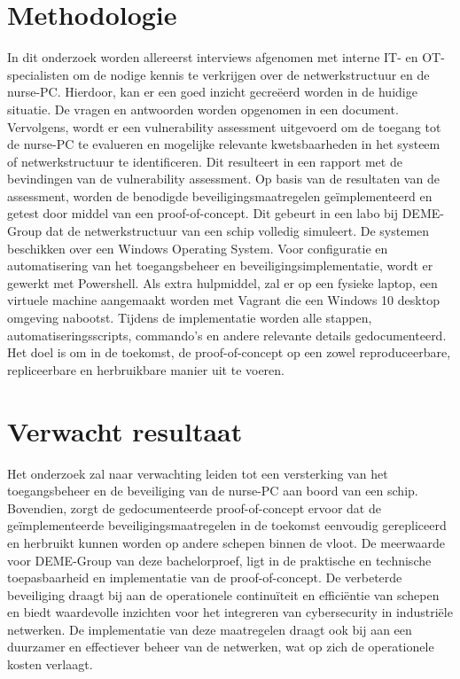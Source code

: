 \section{Methodologie}%
\label{sec:methodologie}
In dit onderzoek worden allereerst interviews afgenomen met interne IT- en OT- specialisten om de nodige kennis te verkrijgen over de netwerkstructuur en de nurse-PC.
Hierdoor, kan er een goed inzicht gecreëerd worden in de huidige situatie. De vragen en antwoorden worden opgenomen in een document.
Vervolgens, wordt er een vulnerability assessment uitgevoerd om de toegang tot de nurse-PC te evalueren en mogelijke relevante kwetsbaarheden in het systeem of netwerkstructuur te identificeren. 
Dit resulteert in een rapport met de bevindingen van de vulnerability assessment.
Op basis van de resultaten van de assessment, worden de benodigde beveiligingsmaatregelen geïmplementeerd en getest door middel van een proof-of-concept. Dit gebeurt in een labo bij DEME-Group dat de netwerkstructuur van een schip volledig simuleert.  
De systemen beschikken over een Windows Operating System. Voor configuratie en automatisering van het toegangsbeheer en beveiligingsimplementatie, wordt er gewerkt met Powershell. 
Als extra hulpmiddel, zal er op een fysieke laptop, een virtuele machine aangemaakt worden met Vagrant die een Windows 10 desktop omgeving nabootst.
Tijdens de implementatie worden alle stappen, automatiseringsscripts, commando's en andere relevante details gedocumenteerd. Het doel is om in de toekomst, de proof-of-concept op een zowel reproduceerbare, repliceerbare en herbruikbare manier uit te voeren.


\section{Verwacht resultaat}%
\label{sec:verwachte_resultaten}
Het onderzoek zal naar verwachting leiden tot een versterking van het toegangsbeheer en de beveiliging van de nurse-PC aan boord van een schip.   
Bovendien, zorgt de gedocumenteerde proof-of-concept ervoor dat de geïmplementeerde beveiligingsmaatregelen in de toekomst eenvoudig gerepliceerd en herbruikt kunnen worden op andere schepen binnen de vloot.
De meerwaarde voor DEME-Group van deze bachelorproef, ligt in de praktische en technische toepasbaarheid en implementatie van de proof-of-concept. 
De verbeterde beveiliging draagt bij aan de operationele continuïteit en efficiëntie van schepen en biedt waardevolle inzichten voor het integreren van cybersecurity in industriële netwerken. 
De implementatie van deze maatregelen draagt ook bij aan een duurzamer en effectiever beheer van de netwerken, wat op zich de operationele kosten verlaagt.



